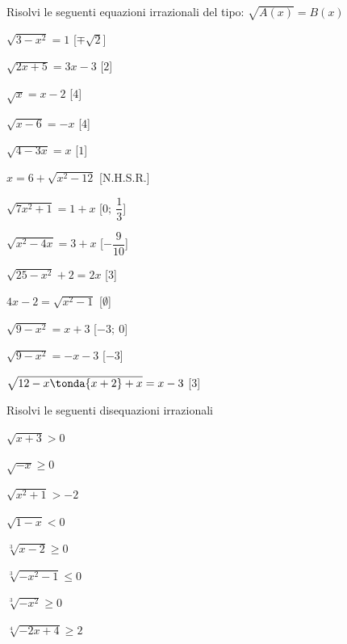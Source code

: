 \begin{esercizio}\label{ese:03.1}
Risolvi le seguenti equazioni irrazionali del tipo:
\(\sqrt{A(x)} = B(x)\)
\begin{multicols}{2}
\begin{enumeratea}
\item \(\sqrt{3 -x^2} = 1\) \hfill [\(\mp \sqrt{2}\)]
\item \(\sqrt{2x +5} = 3x -3\) \hfill [\(2\)]
\item \(\sqrt{x} = x-2\) \hfill [\(4\)]
\item \(\sqrt{x -6} = -x\) \hfill [\(4\)]
\item \(\sqrt{4 -3x} = x\) \hfill [\(1\)]
\item \(x = 6 +\sqrt{x^2 -12}\) \hfill [N.H.S.R.]
\item \(\sqrt{7x^2 +1} = 1 +x\) \hfill [\(0;~\dfrac{1}{3}\)]
\item \(\sqrt{x^2 -4x} = 3 +x\) \hfill [\(-\dfrac{9}{10}\)]
\item \(\sqrt{25 -x^2} +2 = 2x\) \hfill [\(3\)]
\item \(4x -2 = \sqrt{x^2 -1}\) \hfill [\(\emptyset\)]
\item \(\sqrt{9 -x^2} = x +3\) \hfill [\(-3;~0\)]
\item \(\sqrt{9 -x^2} = -x -3\) \hfill [\(-3\)]
\item \(\sqrt{12 -x\tonda{x +2} +x} = x -3\) \hfill [\(3\)]
\end{enumeratea}
\end{multicols}
\end{esercizio}

\begin{esercizio}\label{ese:03.1}
Risolvi le seguenti disequazioni irrazionali
\begin{multicols}{2}
\begin{enumeratea}
\item \(\sqrt{x+3} > 0\)
\item \(\sqrt{-x} \geq 0 \)
\item \(\sqrt{x^2 +1} > -2 \)
\item \(\sqrt{1 -x} < 0\)
\item \(\sqrt[3]{x-2} \geq 0\)
\item \(\sqrt[3]{-x^2-1} \leq 0\)
\item \(\sqrt[3]{-x^2} \geq 0\)
\item \(\sqrt[4]{-2x +4} \geq 2\)
\end{enumeratea}
\end{multicols}
\end{esercizio}

